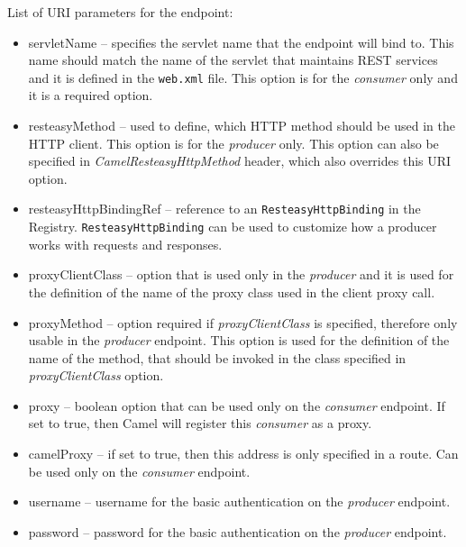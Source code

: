 \documentclass[12pt,final,oneside]{fithesis2}
\begin{document}
List of URI parameters for the endpoint:
\begin{itemize}
\item
servletName -- specifies the servlet name that the endpoint will bind to. This name should match the name of the servlet that maintains REST services and it is defined in the \texttt{web.xml} file. This option is for the \textit{consumer} only and it is a required option. 

\item
resteasyMethod -- used to define, which HTTP method should be used in the HTTP client. This option is for the \textit{producer} only. This option can also be specified in \textit{CamelResteasyHttpMethod} header, which also overrides this URI option.

\item
resteasyHttpBindingRef --  reference to an \texttt{ResteasyHttpBinding} in the Registry. \texttt{ResteasyHttpBinding} can be used to customize how a producer works with requests and responses.

\item
proxyClientClass -- option that is used only in the \textit{producer} and it is used for the definition of the name of the proxy class used in the client proxy call.

\item    
proxyMethod -- option required if \textit{proxyClientClass} is specified, therefore only usable in the \textit{producer} endpoint. This option is used for the definition of the name of the method, that should be invoked in the class specified in \textit{proxyClientClass} option.

\item
proxy -- boolean option that can be used only on the \textit{consumer} endpoint. If set to true, then Camel will register this \textit{consumer} as a proxy. 

\item 
camelProxy -- if set to true, then this address is only specified in a route. Can be used only on the \textit{consumer} endpoint.

\item
username -- username for the basic authentication on the \textit{producer} endpoint.

\item
password -- password for the basic authentication on the \textit{producer} endpoint.

\end{itemize}
\end{document}

